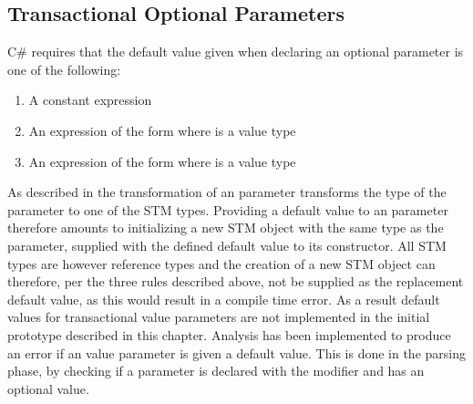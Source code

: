 \subsection{Transactional Optional Parameters}
C\# requires that the default value given when declaring an optional parameter is one of the following\cite[p. 309]{csharp2013specificaiton}:
\begin{enumerate}
	\item A constant expression
	\item An expression of the form  where  is a value type
	\item An expression of the form  where  is a value type
\end{enumerate}
As described in  the transformation of an  parameter transforms the type of the parameter to one of the \ac{STM} types. Providing a default value to an  parameter therefore amounts to initializing a new \ac{STM} object with the same type as the parameter, supplied with the defined default value to its constructor. All \ac{STM} types are however reference types and the creation of a new \ac{STM} object can therefore, per the three rules described above, not be supplied as the replacement default value, as this would result in a compile time error. As a result default values for transactional value parameters are not implemented in the initial prototype described in this chapter. Analysis has been implemented to produce an error if an  value parameter is given a default value. This is done in the parsing phase, by checking if a parameter is declared with the  modifier and has an optional value.

